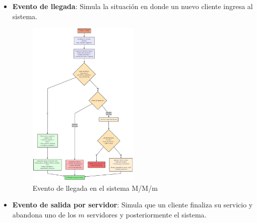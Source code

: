 \documentclass{article}
\begin{document}
\begin{itemize}
    \item \textbf{Evento de llegada}: Simula la situación en donde un nuevo cliente ingresa al sistema.
\begin{figure}[H]
    \centering
    \includegraphics[width=0.5\textwidth]{images/flujos/ErlangLlegada.png}
    \caption{Evento de llegada en el sistema M/M/m}
    \label{fig:mm_m_llegada}
\end{figure}

    \item \textbf{Evento de salida por servidor}: Simula que un cliente finaliza su servicio y abandona uno de los $m$ servidores y posteriormente el sistema.


\end{itemize}
\end{document}

